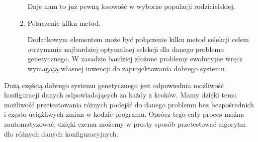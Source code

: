 \begin{par}
\begin{enumerate}
\begin{par}
\begin{enumerate}
\begin{par}
					Daje nam to już pewną losowość w wyborze populacji rodzicielskiej.
				\end{par}
			\item Połączenie kilku metod.
				\begin{par}
					Dodatkowym elementem może być połączenie kilku metod selekcji celem otrzymania najbardziej optymalnej selekcji dla danego problemu genetycznego. 
					W zasadzie bardziej złożone problemy ewolucyjne wręcz wymagają własnej inwencji do zaprojektowania dobrego systemu.
				\end{par}
		\end{enumerate}
	\end{par}
\end{enumerate}
	Dużą częścią dobrego systemu genetycznego jest odpowiednia możliwość konfiguracji danych odpowiadających za każdy z kroków.
	Mamy dzięki temu możliwość przetestowania różnych podejść do danego problemu bez bezpośrednich i często uciążliwych zmian w kodzie programu.
	Oprócz tego cały proces można zautomatyzować, dzięki czemu możemy w prosty sposób przetestować algorytm dla różnych danych konfiguracyjnych.
\end{par}
